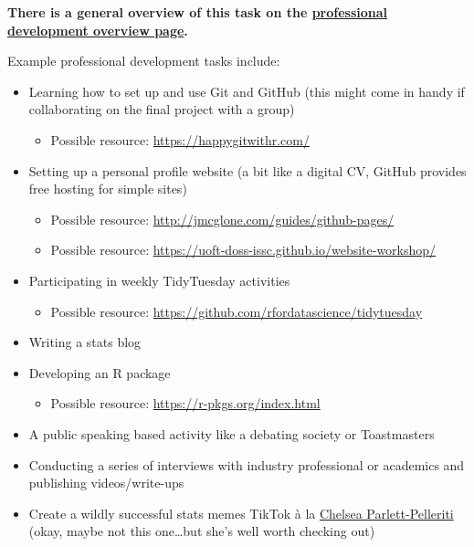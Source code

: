 \documentclass[
  openany]{book}
\providecommand{\tightlist}{%
  \setlength{\itemsep}{0pt}\setlength{\parskip}{0pt}}
\begin{document}
\textbf{There is a general overview of this task on the \href{https://q.utoronto.ca/courses/204826/pages/professional-development}{professional development overview page}.}

Example professional development tasks include:

\begin{itemize}
\item
  Learning how to set up and use Git and GitHub (this might come in handy if collaborating on the final project with a group)

  \begin{itemize}
  \tightlist
  \item
    Possible resource: \url{https://happygitwithr.com/}
  \end{itemize}
\item
  Setting up a personal profile website (a bit like a digital CV, GitHub provides free hosting for simple sites)

  \begin{itemize}
  \tightlist
  \item
    Possible resource: \url{http://jmcglone.com/guides/github-pages/}
  \item
    Possible resource: \url{https://uoft-doss-issc.github.io/website-workshop/}
  \end{itemize}
\item
  Participating in weekly TidyTuesday activities

  \begin{itemize}
  \tightlist
  \item
    Possible resource: \url{https://github.com/rfordatascience/tidytuesday}
  \end{itemize}
\item
  Writing a stats blog
\item
  Developing an R package

  \begin{itemize}
  \tightlist
  \item
    Possible resource: \url{https://r-pkgs.org/index.html}
  \end{itemize}
\item
  A public speaking based activity like a debating society or Toastmasters
\item
  Conducting a series of interviews with industry professional or academics and publishing videos/write-ups
\item
  Create a wildly successful stats memes TikTok à la \href{https://www.tiktok.com/@chelseaparlettpelleriti/video/6811647290709757189?u_code=d894729j1bcal8\&preview_pb=0\&language=en\&timestamp=1585960235\&user_id=6736543492652696582\&utm_campaign=client_share\&app=musically\&utm_medium=ios\&user_id=6736543492652696582\&tt_from=twitter\&utm_source=twitter\&source=h5_m}{Chelsea Parlett-Pelleriti} (okay, maybe not this one\ldots but she's well worth checking out)
\end{itemize}
\end{document}
